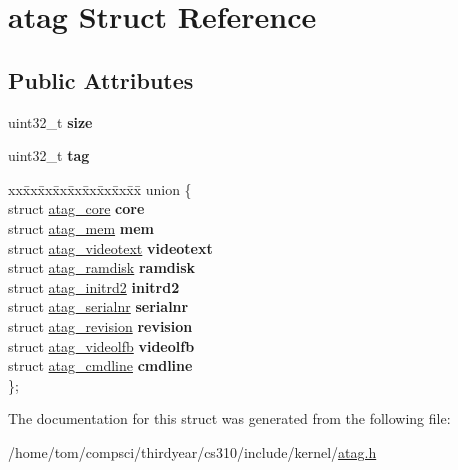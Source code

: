 \hypertarget{structatag}{}\section{atag Struct Reference}
\label{structatag}
\subsection*{Public Attributes}
\begin{DoxyCompactItemize}
\item 
\mbox{\label{structatag_ae02368d787b0bff45e88bc34c7ed6f02}} 
uint32\+\_\+t {\bfseries size}
\item 
\mbox{\label{structatag_aaf11d082870830af17070aaa70f680b2}} 
uint32\+\_\+t {\bfseries tag}
\item 
\mbox{\label{structatag_aa7ff458a2c118c39cfbe118e50eee5b9}} 
\begin{tabbing}
xx\=xx\=xx\=xx\=xx\=xx\=xx\=xx\=xx\=\kill
union \{\\
\>struct \mbox{\hyperlink{structatag__core}{atag\_core}} {\bfseries core}\\
\>struct \mbox{\hyperlink{structatag__mem}{atag\_mem}} {\bfseries mem}\\
\>struct \mbox{\hyperlink{structatag__videotext}{atag\_videotext}} {\bfseries videotext}\\
\>struct \mbox{\hyperlink{structatag__ramdisk}{atag\_ramdisk}} {\bfseries ramdisk}\\
\>struct \mbox{\hyperlink{structatag__initrd2}{atag\_initrd2}} {\bfseries initrd2}\\
\>struct \mbox{\hyperlink{structatag__serialnr}{atag\_serialnr}} {\bfseries serialnr}\\
\>struct \mbox{\hyperlink{structatag__revision}{atag\_revision}} {\bfseries revision}\\
\>struct \mbox{\hyperlink{structatag__videolfb}{atag\_videolfb}} {\bfseries videolfb}\\
\>struct \mbox{\hyperlink{structatag__cmdline}{atag\_cmdline}} {\bfseries cmdline}\\
\}; \\

\end{tabbing}\end{DoxyCompactItemize}


The documentation for this struct was generated from the following file\+:\begin{DoxyCompactItemize}
\item 
/home/tom/compsci/thirdyear/cs310/include/kernel/\mbox{\hyperlink{atag_8h}{atag.\+h}}\end{DoxyCompactItemize}
